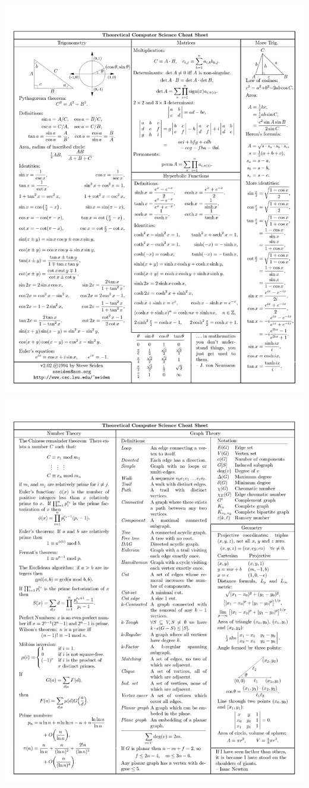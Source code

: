 \documentclass{article}
\begin{document}
\newpage
\includegraphics[trim = 6mm 2mm 0mm 10mm,clip=true,scale = 0.73]{./images/image-0004.jpg}
\newpage
\includegraphics[trim = 6mm 2mm 0mm 10mm,clip=true,scale = 0.73]{./images/image-0005.jpg}
\end{document}
